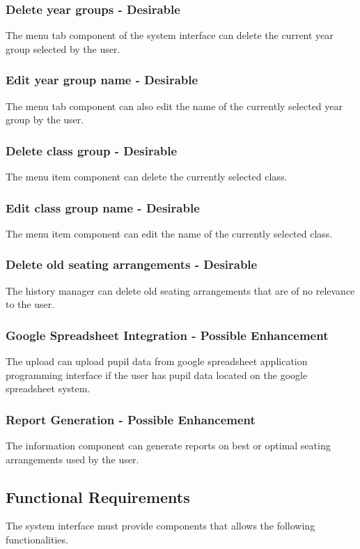 \subsubsection{Delete year groups - Desirable}
The menu tab component of the system interface can delete the current year group selected by the user.

\subsubsection{Edit year group name - Desirable}
The menu tab component can also edit the name of the currently selected year group by the user.

\subsubsection{Delete class group - Desirable}
The menu item component can delete the currently selected class. 

\subsubsection{Edit class group name - Desirable}
The menu item component can edit the name of the currently selected class.

\subsubsection{Delete old seating arrangements - Desirable}
The history manager can delete old seating arrangements that are of no relevance to the user.

\subsubsection{Google Spreadsheet Integration - Possible Enhancement}
The upload can upload pupil data from google spreadsheet application programming interface if the user has pupil data located on the google spreadsheet system.

\subsubsection{Report Generation - Possible Enhancement}
The information component can generate reports on best or optimal seating arrangements used by the user.

\subsection{Functional Requirements}
The system interface must provide components that allows the following functionalities.
